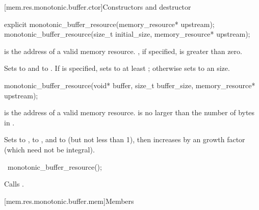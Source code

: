 [mem.res.monotonic.buffer.ctor]{Constructors and destructor}

%
\begin{itemdecl}
explicit monotonic_buffer_resource(memory_resource* upstream);
monotonic_buffer_resource(size_t initial_size, memory_resource* upstream);
\end{itemdecl}

\begin{itemdescr}
\pnum
\expects
{} is the address of a valid memory resource.
, if specified, is greater than zero.

\pnum
\effects
Sets  to  and
 to .
If  is specified,
sets  to at least ;
otherwise sets  to an
 size.
\end{itemdescr}

%
\begin{itemdecl}
monotonic_buffer_resource(void* buffer, size_t buffer_size, memory_resource* upstream);
\end{itemdecl}

\begin{itemdescr}
\pnum
\expects
{} is the address of a valid memory resource.
 is no larger than the number of bytes in .

\pnum
\effects
Sets  to ,
 to , and
 to  (but not less than 1),
then increases 
by an  growth factor (which need not be integral).
\end{itemdescr}

%
\begin{itemdecl}
~monotonic_buffer_resource();
\end{itemdecl}

\begin{itemdescr}
\pnum
\effects
Calls .
\end{itemdescr}


[mem.res.monotonic.buffer.mem]{Members}

